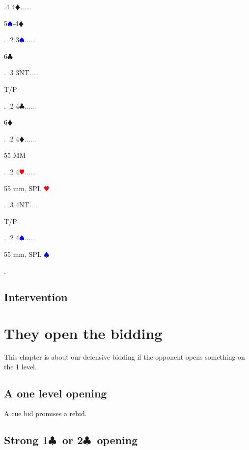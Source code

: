 \documentclass[a4paper]{article}
\newcommand{\BC}{\textcolor{OliveGreen}{$\clubsuit$}}
\newcommand{\BD}{\textcolor{RedOrange}{$\vardiamondsuit$}}
\newcommand{\BH}{\textcolor{Red}{$\varheartsuit${}}}
\newcommand{\BS}{\textcolor{Blue}{$\spadesuit${}}}
\newcommand{\pdfc}{\texorpdfstring{\BC{}}{C}}
\begin{document}
{ .4 4\BD......\begin{minipage}[t]{0.8\textwidth}
5\BS -4\BD 
\end{minipage}. 
 .2 3\BS......\begin{minipage}[t]{0.8\textwidth}
6\BC 
\end{minipage}. 
 .3 3NT.....\begin{minipage}[t]{0.8\textwidth}
T/P
\end{minipage}. 
 .2 4\BC......\begin{minipage}[t]{0.8\textwidth}
6\BD 
\end{minipage}. 
 .2 4\BD......\begin{minipage}[t]{0.8\textwidth}
55 MM
\end{minipage}. 
 .2 4\BH......\begin{minipage}[t]{0.8\textwidth}
55 mm, SPL \BH 
\end{minipage}. 
 .3 4NT.....\begin{minipage}[t]{0.8\textwidth}
T/P
\end{minipage}. 
 .2 4\BS......\begin{minipage}[t]{0.8\textwidth}
55 mm, SPL \BS 
\end{minipage}. 
}
\bigbreak
\subsection{Intervention}

\section{They open the bidding}

This chapter is about our defensive bidding if the opponent opens something on the 1 level.
\bigbreak
\subsection{A one level opening}

A cue bid promises a rebid.
\bigbreak
\subsection{Strong 1\pdfc\ or 2\pdfc\ opening}
\end{document}
